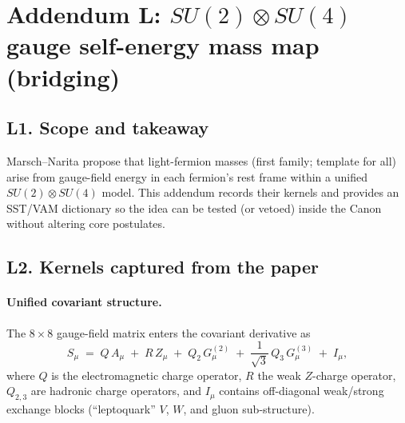 \documentclass[11pt]{article}
\begin{document}
  \titlepageOpen

  \begin{abstract}


  \end{abstract}

  \titlepageClose
  \fi

  \ifdefined\standalonechapter
  \section{\papertitle}
  \else
  \fi


  \section*{Addendum L: \texorpdfstring{$SU(2)\otimes SU(4)$}{SU(2)xSU(4)} gauge self-energy mass map (bridging)}

      \subsection*{L1. Scope and takeaway}
          Marsch--Narita propose that light-fermion masses (first family; template for all) arise from gauge-field energy in each fermion's rest frame within a unified $SU(2)\otimes SU(4)$ model. This addendum records their kernels and provides an SST/VAM dictionary so the idea can be tested (or vetoed) inside the Canon without altering core postulates.

      \subsection*{L2. Kernels captured from the paper}

          \paragraph{Unified covariant structure.}
              The $8\times 8$ gauge-field matrix enters the covariant derivative as
              \begin{equation}
              S_\mu \;=\; Q\,A_\mu \;+\; R\,Z_\mu \;+\; Q_2\,G^{(2)}_{\mu} \;+\; \frac{1}{\sqrt{3}}\,Q_3\,G^{(3)}_{\mu} \;+\; I_\mu,
              \label{eq:L2.1}
              \end{equation}
              where $Q$ is the electromagnetic charge operator, $R$ the weak $Z$-charge operator, $Q_{2,3}$ are hadronic charge operators, and $I_\mu$ contains off-diagonal weak/strong exchange blocks (``leptoquark'' $V$, $W$, and gluon sub-structure).
\end{document}

